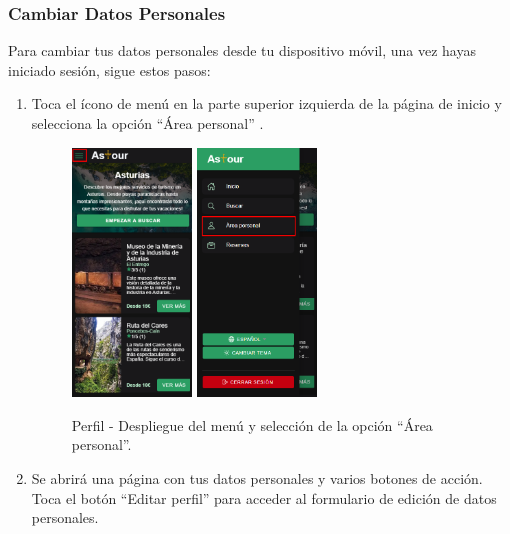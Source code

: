 \subsubsection{Cambiar Datos Personales}
Para cambiar tus datos personales desde tu dispositivo móvil, una vez hayas iniciado sesión, sigue estos pasos:
\begin{enumerate}
	\item Toca el ícono de menú en la parte superior izquierda de la página de inicio y selecciona la opción “Área personal” .
	      \begin{figure}[H]
		      \centering
		      \includegraphics[width=0.3\textwidth]{7-Construccion/Manuales/mobile/menu marcado.png}
		      \includegraphics[width=0.3\textwidth]{7-Construccion/Manuales/mobile/area personal marcado.png}
		      \caption{Perfil - Despliegue del menú y selección de la opción “Área personal”.}
	      \end{figure}
	\item Se abrirá una página con tus datos personales y varios botones de acción. Toca el botón “Editar perfil” para acceder al formulario de edición de datos personales.

\end{enumerate}
